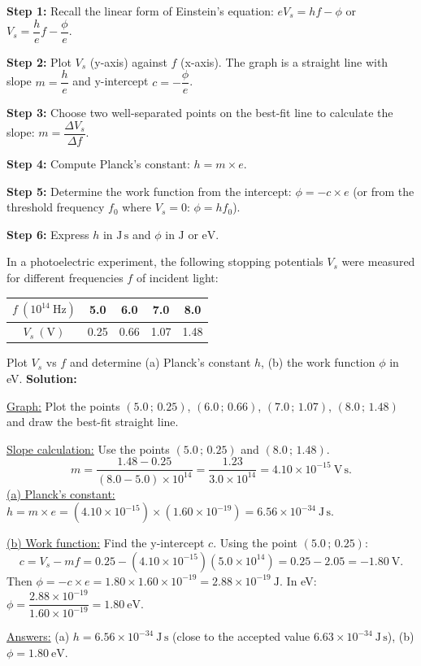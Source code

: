 \documentclass[11pt]{article}
\begin{document}
\begin{methode}
\textbf{Step 1:} Recall the linear form of Einstein's equation: $eV_s = hf - \phi$ or $V_s = \dfrac{h}{e}f - \dfrac{\phi}{e}$.\par
\textbf{Step 2:} Plot $V_s$ (y-axis) against $f$ (x-axis). The graph is a straight line with slope $m = \dfrac{h}{e}$ and y-intercept $c = -\dfrac{\phi}{e}$.\par
\textbf{Step 3:} Choose two well-separated points on the best-fit line to calculate the slope: $m = \dfrac{\Delta V_s}{\Delta f}$.\par
\textbf{Step 4:} Compute Planck's constant: $h = m \times e$.\par
\textbf{Step 5:} Determine the work function from the intercept: $\phi = -c \times e$ (or from the threshold frequency $f_0$ where $V_s = 0$: $\phi = hf_0$).\par
\textbf{Step 6:} Express $h$ in $\mathrm{J\,s}$ and $\phi$ in $\mathrm{J}$ or $\mathrm{eV}$.
\end{methode}

\begin{exoresolu}
In a photoelectric experiment, the following stopping potentials $V_s$ were measured for different frequencies $f$ of incident light:

\begin{center}
\begin{tabular}{|c|c|c|c|c|}
\hline
$f\ (10^{14}\ \mathrm{Hz})$ & 5.0 & 6.0 & 7.0 & 8.0 \\ \hline
$V_s\ (\mathrm{V})$ & 0.25 & 0.66 & 1.07 & 1.48 \\ \hline
\end{tabular}
\end{center}
Plot $V_s$ vs $f$ and determine (a) Planck's constant $h$, (b) the work function $\phi$ in eV.
\tcblower
\textbf{Solution:}\par
\underline{Graph:} Plot the points $(5.0\,;\,0.25)$, $(6.0\,;\,0.66)$, $(7.0\,;\,1.07)$, $(8.0\,;\,1.48)$ and draw the best-fit straight line.\par
\underline{Slope calculation:} Use the points $(5.0\,;\,0.25)$ and $(8.0\,;\,1.48)$.
\[
m = \frac{1.48 - 0.25}{(8.0 - 5.0)\times10^{14}} = \frac{1.23}{3.0\times10^{14}} = 4.10\times10^{-15}\ \mathrm{V\,s}.
\]
\underline{(a) Planck's constant:} $h = m \times e = (4.10\times10^{-15}) \times (1.60\times10^{-19}) = 6.56\times10^{-34}\ \mathrm{J\,s}$.\par
\underline{(b) Work function:} Find the y-intercept $c$. Using the point $(5.0\,;\,0.25)$:
\[
c = V_s - m f = 0.25 - (4.10\times10^{-15})(5.0\times10^{14}) = 0.25 - 2.05 = -1.80\ \mathrm{V}.
\]
Then $\phi = -c \times e = 1.80 \times 1.60\times10^{-19} = 2.88\times10^{-19}\ \mathrm{J}$.
In eV: $\phi = \dfrac{2.88\times10^{-19}}{1.60\times10^{-19}} = 1.80\ \mathrm{eV}$.\par
\underline{Answers:} (a) $h = 6.56\times10^{-34}\ \mathrm{J\,s}$ (close to the accepted value $6.63\times10^{-34}\ \mathrm{J\,s}$), (b) $\phi = 1.80\ \mathrm{eV}$.
\end{exoresolu}
\end{document}
